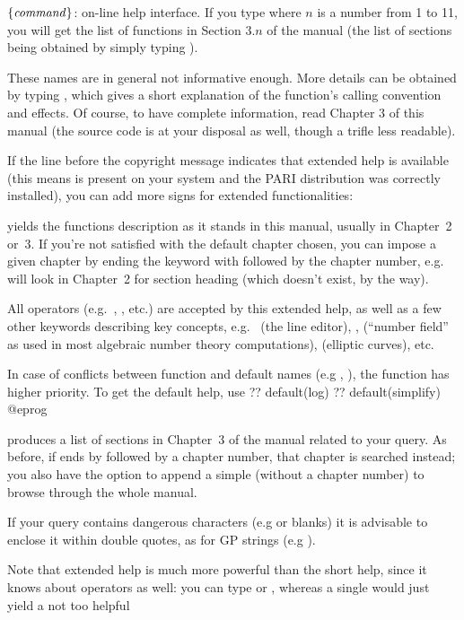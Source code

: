 $\{\hbox{\it command\/}\}$:  on-line help interface.
If you type  where $n$ is a number from 1 to 11, you will get the
list of functions in Section $3.n$ of the manual (the list of sections being
obtained by simply typing ). \label{se:exthelp}

These names are in general not informative enough. More details can be
obtained by typing , which gives a short explanation of
the function's calling convention and effects. Of course, to have complete
information, read Chapter 3 of this manual (the source code is at your
disposal as well, though a trifle less readable).

If the line before the copyright message indicates that extended help is
available (this means  is present on your system and the PARI
distribution was correctly installed), you can add more  signs for
extended functionalities:

 yields the functions description as it stands in this
manual, usually in Chapter~2 or~3. If you're not satisfied with the default
chapter chosen, you can impose a given chapter by ending the keyword with
 followed by the chapter number, e.g.~ will look in
Chapter~2 for section heading  (which doesn't exist, by the way).

All operators (e.g.~\kbd{+}, \kbd{\&\&}, etc.) are accepted by this
extended help, as well as a few other keywords describing key  concepts,
e.g.~ (the line editor), ,  (``number
field'' as used in most algebraic number theory computations), 
(elliptic curves), etc.

In case of conflicts between function and default names (e.g ,
), the function has higher priority. To get the default help,
use
\bprog
  ?? default(log)
  ?? default(simplify)
@eprog

 produces a list of sections in Chapter~3 of the
manual related to your query. As before, if  ends by 
followed by a chapter number, that chapter is searched instead; you also
have the option to append a simple  (without a chapter number) to
browse through the whole manual.

If your query contains dangerous characters (e.g  or blanks) it is
advisable to enclose it within double quotes, as for GP strings (e.g
).

Note that extended help is much more powerful than the short help, since
it knows about operators as well: you can type  or
, whereas a single  would just yield a not too helpful

